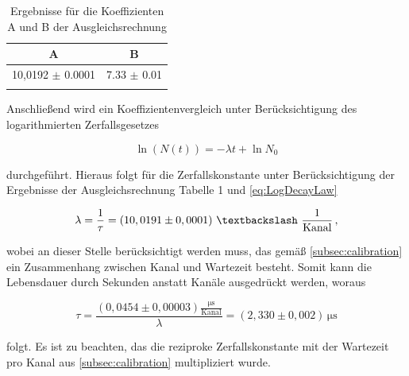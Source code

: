 \begin{table}[h!]
  \centering
\begin{tabular}{cc} \toprule
A   & B  \\ \midrule
10,0192 $\pm$ 0.0001 & 7.33 $\pm$ 0.01 \\
\bottomrule
\label{tab:Fit}
\end{tabular}
\caption{Ergebnisse für die Koeffizienten A und B der Ausgleichsrechnung}
\end{table}

Anschließend wird ein Koeffizientenvergleich unter Berücksichtigung des logarithmierten Zerfallsgesetzes

\begin{equation}
\ln(N(t)) = -\lambda t + \ln{N_0}
\label{eq:LogDecayLaw}
\end{equation}

\noindent durchgeführt. Hieraus folgt für die Zerfallskonstante unter Berücksichtigung der Ergebnisse der Ausgleichsrechnung Tabelle 1 und \ref{eq:LogDecayLaw}

\begin{equation}
\lambda = \frac{1}{\tau} = (10,0191 \pm 0,0001) \,\, \textbackslash \,\, \frac{1}{\text{Kanal}}\,,
\end{equation}

\noindent wobei an dieser Stelle berücksichtigt werden muss, das gemäß \ref{subsec:calibration} ein Zusammenhang zwischen Kanal und Wartezeit besteht. Somit kann
die Lebensdauer durch Sekunden anstatt Kanäle ausgedrückt werden, woraus

\begin{equation}
\tau = \frac{(0,0454 \pm 0,00003) \frac{\si{\micro\second}}{\text{Kanal}}}{\lambda} = (2,330 \pm 0,002) \, \si{\micro\second}
\end{equation}

\noindent folgt. Es ist zu beachten, das die reziproke Zerfallskonstante mit der Wartezeit pro Kanal aus \ref{subsec:calibration} multipliziert wurde.
